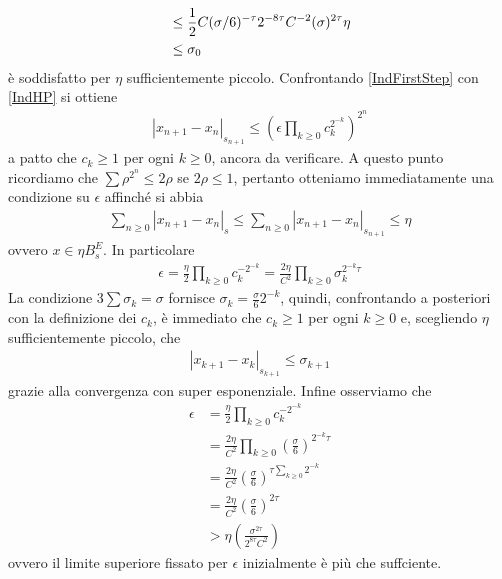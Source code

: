 \documentclass[twoside, 11pt]{amsbook}
\makeatletter
\newcommand{\0}{{(0)}}
\newcommand{\3}{{(3)}}
\theoremstyle{colonplain}
\theoremstyle{colondefinition}
\theoremstyle{colonremark}
\numberwithin{equation}{chapter}
\renewcommand{\proofname}{Dimostrazione}
\renewenvironment{proof}[1][\proofname]{\par
  \pushQED{\qed}%
  \normalfont \topsep6\p@\@plus6\p@\relax
  \trivlist
  \item[\hskip\labelsep\bfseries #1:]\ignorespaces
}{%
  \popQED\endtrivlist\@endpefalse
}
\makeatother
\begin{document}
\begin{proof}
\begin{align}
    &\leq \frac{1}{2}C(\sigma/6)^{-\tau}2^{-8\tau}C^{-2}(\sigma)^{2\tau}\eta \notag \\
    &\leq \sigma_0
\end{align}
è soddisfatto per $\eta$ sufficientemente piccolo. Confrontando \eqref{IndFirstStep} con \eqref{IndHP} si ottiene
\begin{align}
    |x_{n + 1} - x_n|_{s_{n + 1}} \leq \left(\epsilon\prod_{k \geq 0} c^{2^{-k}}_k\right)^{2^n}
\end{align}
a patto che $c_k \geq 1$ per ogni $k \geq 0$, ancora da verificare. A questo punto ricordiamo che $\sum \rho^{2^n} \leq 2\rho$ se $2\rho \leq 1$, pertanto otteniamo immediatamente una condizione su $\epsilon$ affinché si abbia
\begin{align}
    \sum_{n \geq 0} |x_{n + 1} - x_n|_s \leq \sum_{n \geq 0} |x_{n + 1} - x_n|_{s_{n + 1}} \leq \eta
\end{align}
ovvero $x \in \eta B^E_s$. In particolare
\begin{align}
    \epsilon = \frac{\eta}{2}\prod_{k \geq 0} c^{-2^{-k}}_k = \frac{2\eta}{C^2}\prod_{k \geq 0} \sigma^{2^{-k}\tau}_k 
\end{align}
La condizione $3\sum \sigma_k = \sigma$ fornisce $\sigma_k = \frac{\sigma}{6}2^{-k}$, quindi, confrontando a posteriori con la definizione dei $c_k$, è immediato che $c_k \geq 1$ per ogni $k \geq 0$ e, scegliendo $\eta$ sufficientemente piccolo, che
\begin{align}
    |x_{k + 1} - x_k|_{s_{k + 1}} \leq \sigma_{k + 1}
\end{align}
grazie alla convergenza con super esponenziale. Infine osserviamo che
\begin{align}
    \epsilon &= \frac{\eta}{2}\prod_{k \geq 0}c^{-2^{-k}}_k \\
    &= \frac{2\eta}{C^2}\prod_{k \geq 0} \left(\frac{\sigma}{6}\right)^{2^{-k}\tau} \\
    &= \frac{2\eta}{C^2}\left(\frac{\sigma}{6}\right)^{\tau\sum_{k \geq 0}2^{-k}} \\
    &= \frac{2\eta}{C^2}\left(\frac{\sigma}{6}\right)^{2\tau} \\
    &> \eta\left(\frac{\sigma^{2\tau}}{2^{8\tau}C^2}\right)
\end{align}
ovvero il limite superiore fissato per $\epsilon$ inizialmente è più che suffciente.
\end{proof}
\end{document}

